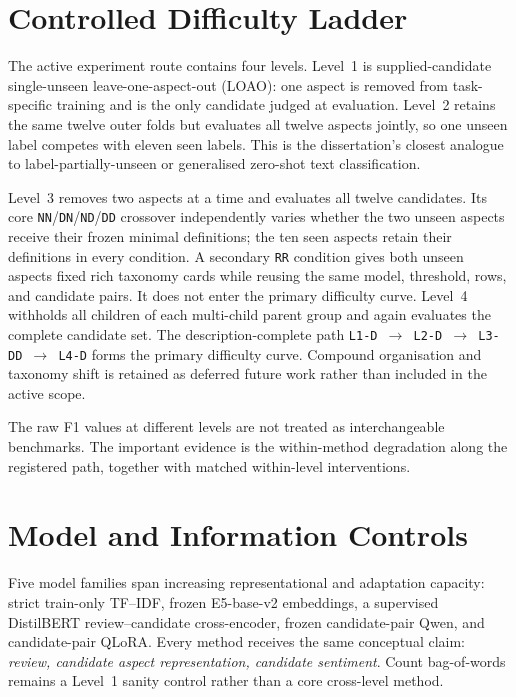 \section{Controlled Difficulty Ladder}

The active experiment route contains four levels. Level~1 is
supplied-candidate single-unseen leave-one-aspect-out (LOAO): one aspect is
removed from task-specific training and is the only candidate judged at
evaluation. Level~2 retains the same twelve outer folds but evaluates all twelve
aspects jointly, so one unseen label competes with eleven seen labels. This is
the dissertation's closest analogue to label-partially-unseen or generalised
zero-shot text classification.

Level~3 removes two aspects at a time and evaluates all twelve candidates. Its
core \texttt{NN}/\texttt{DN}/\texttt{ND}/\texttt{DD} crossover independently
varies whether the two unseen aspects receive their frozen minimal definitions;
the ten seen aspects retain their definitions in every condition. A secondary
\texttt{RR} condition gives both unseen aspects fixed rich taxonomy cards while
reusing the same model, threshold, rows, and candidate pairs. It does not enter
the primary difficulty curve. Level~4
withholds all children of each multi-child parent group and again evaluates the
complete candidate set. The description-complete path
\texttt{L1-D $\rightarrow$ L2-D $\rightarrow$ L3-DD $\rightarrow$ L4-D}
forms the primary difficulty curve. Compound organisation and taxonomy shift is
retained as deferred future work rather than included in the active scope.

The raw F1 values at different levels are not treated as interchangeable
benchmarks. The important evidence is the within-method degradation along the
registered path, together with matched within-level interventions.

\section{Model and Information Controls}

Five model families span increasing representational and adaptation capacity:
strict train-only TF--IDF, frozen E5-base-v2 embeddings, a supervised
DistilBERT review--candidate cross-encoder, frozen candidate-pair Qwen, and
candidate-pair QLoRA. Every method receives the same conceptual claim:
\emph{review, candidate aspect representation, candidate sentiment}. Count
bag-of-words remains a Level~1 sanity control rather than a core cross-level
method.

